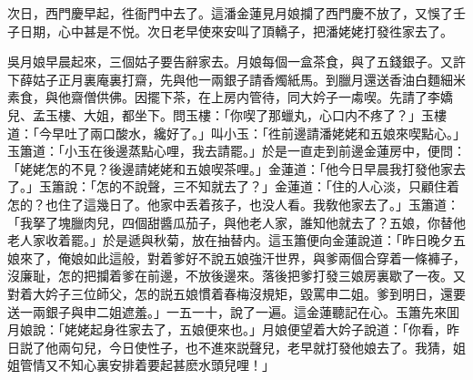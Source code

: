 次日，西門慶早起，徃衙門中去了。這潘金蓮見月娘攔了西門慶不放了，又悞了壬子日期，心中甚是不悦。次日老早使來安叫了頂轎子，把潘姥姥打發徃家去了。

吳月娘早晨起來，三個姑子要告辭家去。月娘每個一盒茶食，與了五錢銀子。又許下薛姑子正月裏庵裏打齋，先與他一兩銀子請香燭紙馬。到臘月還送香油白麵細米素食，與他齋僧供佛。因擺下茶，在上房内管待，同大妗子一䖏喫。先請了李嬌兒、孟玉樓、大姐，都坐下。問玉樓：「你喫了那蠟丸，心口内不疼了？」玉樓道：「今早吐了兩口酸水，纔好了。」叫小玉：「徃前邊請潘姥姥和五娘來喫點心。」玉簫道：「小玉在後邊蒸點心哩，我去請罷。」於是一直走到前邊金蓮房中，便問：「姥姥怎的不見？後邊請姥姥和五娘喫茶哩。」金蓮道：「他今日早晨我打發他家去了。」玉簫說：「怎的不說聲，三不知就去了？」金蓮道：「住的人心淡，只顧住着怎的？也住了這幾日了。他家中丢着孩子，也没人看。我敎他家去了。」玉簫道：「我拏了塊臘肉兒，四個甜醬瓜茄子，與他老人家，誰知他就去了？五娘，你替他老人家收着罷。」於是遞與秋菊，放在抽替内。這玉簫便向金蓮說道：「昨日晚夕五娘來了，俺娘如此這般，對着爹好不說五娘強汗世界，與爹兩個合穿着一條褲子，沒廉耻，怎的把攔着爹在前邊，不放後邊來。落後把爹打發三娘房裏歇了一夜。又對着大妗子三位師父，怎的説五娘慣着春梅沒規矩，毀罵申二姐。爹到明日，還要送一兩銀子與申二姐遮羞。」一五一十，說了一遍。這金蓮聽記在心。玉簫先來囬月娘說：「姥姥起身徃家去了，五娘便來也。」月娘便望着大妗子說道：「你看，昨日説了他兩句兒，今日使性子，也不進來説聲兒，老早就打發他娘去了。我猜，姐姐管情又不知心裏安排着要起甚麽水頭兒哩！」

